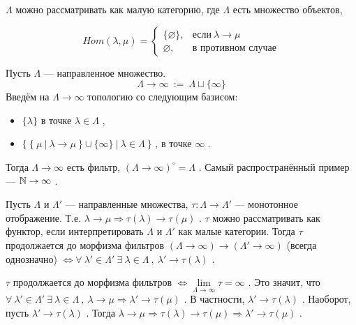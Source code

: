 \( \Lambda \) можно рассматривать как малую категорию, где \( \Lambda \) есть множество объектов,

\[ Hom(\lambda,\mu)=
   \begin{cases}
   \{\varnothing\}, & \text{если} ~\lambda \rightarrow \mu \\
   \varnothing    , & \text{в противном случае}
   \end{cases}
\]

\pagebreak

\SSsect[def] Пусть \( \Lambda \) --- направленное множество.
\[ \Lambda \rightarrow \infty ~:=~ \Lambda \sqcup \{\infty\} \]
Введём на \( \Lambda \rightarrow \infty \) топологию со следующим базисом:
\begin{itemize}[label=]
    \item \( \{\lambda\} \) в точке \( \lambda \in \Lambda \) ,
    \item \( \{~\{~\mu~|~\lambda\rightarrow\mu~\} \cup \{\infty\} ~|~ \lambda \in \Lambda ~\} \) , в точке \( \infty \) .
\end{itemize}
Тогда \( \Lambda \rightarrow \infty \) есть фильтр, \( (\Lambda \rightarrow \infty)^\circ=\Lambda \) . Самый распространённый пример --- \( \mathbb{N} \rightarrow \infty \) .

\SSsect Пусть \( \Lambda \) и \( \Lambda' \) --- направленные множества, \( \tau: \Lambda \rightarrow \Lambda' \) --- монотонное отображение. Т.е. \( \lambda \rightarrow \mu \Rightarrow \tau(\lambda) \rightarrow \tau(\mu) \) . \( \tau \) можно рассматривать как функтор, если интерпретировать \( \Lambda \) и \( \Lambda' \) как малые категории.
Тогда \( \tau \) продолжается до морфизма фильтров \( (\Lambda \rightarrow \infty) \rightarrow (\Lambda' \rightarrow \infty) \) (всегда однозначно) \( \Leftrightarrow  \forall~\lambda' \in \Lambda' ~\exists~\lambda \in \Lambda ~,~ \lambda' \rightarrow \tau(\lambda) \) .

\SSproof

\( \tau \) продолжается до морфизма фильтров \( \Leftrightarrow \lim\limits_{\Lambda \rightarrow \infty} \tau = \infty \) . Это значит, что \( \forall~\lambda' \in \Lambda' ~\exists~\lambda \in \Lambda ~,~ \lambda \rightarrow \mu \Rightarrow \lambda' \rightarrow \tau(\mu) \) . В частности, \( \lambda' \rightarrow \tau(\lambda) \) . Наоборот, пусть \( \lambda' \rightarrow \tau(\lambda) \) . Тогда \( \lambda \rightarrow \mu \Rightarrow \tau(\lambda) \rightarrow \tau(\mu) \Rightarrow \lambda' \rightarrow \tau(\mu) \) .

\SSendp

